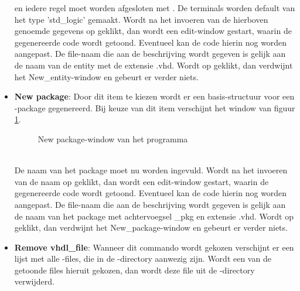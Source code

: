 \begin{itemize}
	       en iedere regel moet worden afgesloten met .
               De terminals worden default van het type 'std\_logic' gemaakt.
               Wordt na het invoeren van de hierboven genoemde gegevens
               op  geklikt, dan wordt een edit-window gestart, waarin
               de gegenereerde code wordt getoond. Eventueel kan de code
               hierin nog worden aangepast.
               De file-naam die aan de beschrijving wordt gegeven
               is gelijk aan de naam van de entity met de extensie .vhd.
               Wordt op  geklikt, dan verdwijnt het New\_entity-window
               en gebeurt er verder niets.
\item {\bf New package}: Door dit item te kiezen wordt er een basis-structuur voor
                   een -package gegenereerd.
                  Bij keuze van dit item verschijnt het window van
                  figuur \ref{newpack-window}.
                  \begin{figure}[htb]
                  \centerline{}
                  \caption{New package-window van het programma }
                  \label{newpack-window}
                  \end{figure}
                  \\
                  De naam van het package moet nu worden ingevuld.
                  Wordt na het invoeren van de naam
                  op  geklikt,  dan wordt een edit-window gestart, waarin
               de gegenereerde code wordt getoond. Eventueel kan de code
               hierin nog worden aangepast.
                 De file-naam die aan de beschrijving wordt gegeven
                 is gelijk aan de naam van het package met achtervoegsel \_pkg
                 en extensie .vhd.
                 Wordt op  geklikt, dan verdwijnt het New\_package-window
                 en gebeurt er verder niets.
\item {\bf Remove vhdl\_file}: Wanneer dit commando wordt gekozen verschijnt
                       er een lijst met alle -files, die in de -directory
                       aanwezig zijn. Wordt een van de getoonde files
                       hieruit gekozen, dan wordt deze file uit de -directory
                       verwijderd.
\end{itemize}

